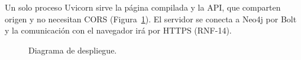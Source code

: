 Un solo proceso Uvicorn sirve la página compilada y la API, que comparten origen y no necesitan CORS (Figura~\ref{fig:despliegue}). El servidor se conecta a Neo4j por Bolt y la comunicación con el navegador irá por HTTPS (RNF-14).

\begin{figure}[htbp]
  \centering
  \caption{Diagrama de despliegue.}
  \label{fig:despliegue}
\end{figure}


%
